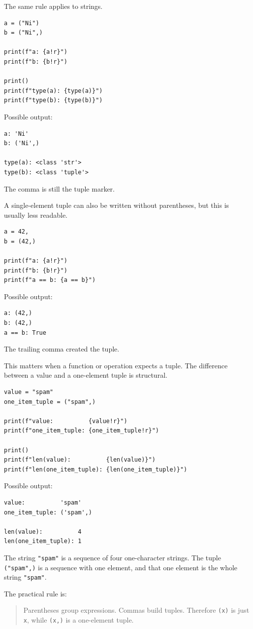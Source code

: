 The same rule applies to strings.

\begin{verbatim}
a = ("Ni")
b = ("Ni",)

print(f"a: {a!r}")
print(f"b: {b!r}")

print()
print(f"type(a): {type(a)}")
print(f"type(b): {type(b)}")
\end{verbatim}

Possible output:

\begin{verbatim}
a: 'Ni'
b: ('Ni',)

type(a): <class 'str'>
type(b): <class 'tuple'>
\end{verbatim}

The comma is still the tuple marker.

A single-element tuple can also be written without parentheses, but this is usually less readable.

\begin{verbatim}
a = 42,
b = (42,)

print(f"a: {a!r}")
print(f"b: {b!r}")
print(f"a == b: {a == b}")
\end{verbatim}

Possible output:

\begin{verbatim}
a: (42,)
b: (42,)
a == b: True
\end{verbatim}

The trailing comma created the tuple.

This matters when a function or operation expects a tuple. The difference between a value and a one-element tuple is structural.

\begin{verbatim}
value = "spam"
one_item_tuple = ("spam",)

print(f"value:          {value!r}")
print(f"one_item_tuple: {one_item_tuple!r}")

print()
print(f"len(value):          {len(value)}")
print(f"len(one_item_tuple): {len(one_item_tuple)}")
\end{verbatim}

Possible output:

\begin{verbatim}
value:          'spam'
one_item_tuple: ('spam',)

len(value):          4
len(one_item_tuple): 1
\end{verbatim}

The string \texttt{"spam"} is a sequence of four one-character strings. The tuple \texttt{("spam",)} is a sequence with one element, and that one element is the whole string \texttt{"spam"}.

The practical rule is:

\begin{quote}
Parentheses group expressions. Commas build tuples. Therefore \texttt{(x)} is just \texttt{x}, while \texttt{(x,)} is a one-element tuple.
\end{quote}